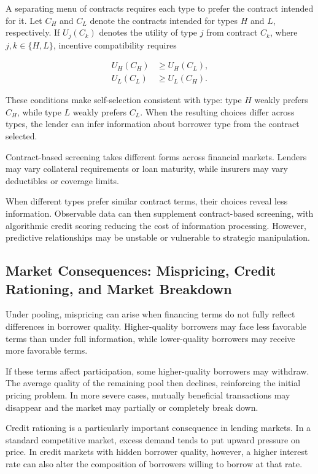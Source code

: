 A separating menu of contracts requires each type to prefer the contract intended for it. Let $C_H$ and $C_L$ denote the contracts intended for types $H$ and $L$, respectively. If $U_j(C_k)$ denotes the utility of type $j$ from contract $C_k$, where $j,k\in\{H,L\}$, incentive compatibility requires

\begin{equation}
\begin{aligned}
U_H(C_H) &\geq U_H(C_L),\\
U_L(C_L) &\geq U_L(C_H).
\end{aligned}
\label{eq:ch3-screening-ic}
\end{equation}

These conditions make self-selection consistent with type: type $H$ weakly prefers $C_H$, while type $L$ weakly prefers $C_L$. When the resulting choices differ across types, the lender can infer information about borrower type from the contract selected.

Contract-based screening takes different forms across financial markets. Lenders may vary collateral requirements or loan maturity, while insurers may vary deductibles or coverage limits.

When different types prefer similar contract terms, their choices reveal less information. Observable data can then supplement contract-based screening, with algorithmic credit scoring reducing the cost of information processing. However, predictive relationships may be unstable or vulnerable to strategic manipulation.

\subsection{Market Consequences: Mispricing, Credit Rationing, and Market Breakdown}

Under pooling, mispricing can arise when financing terms do not fully reflect differences in borrower quality. Higher-quality borrowers may face less favorable terms than under full information, while lower-quality borrowers may receive more favorable terms.

If these terms affect participation, some higher-quality borrowers may withdraw. The average quality of the remaining pool then declines, reinforcing the initial pricing problem. In more severe cases, mutually beneficial transactions may disappear and the market may partially or completely break down.

Credit rationing is a particularly important consequence in lending markets. In a standard competitive market, excess demand tends to put upward pressure on price. In credit markets with hidden borrower quality, however, a higher interest rate can also alter the composition of borrowers willing to borrow at that rate.

